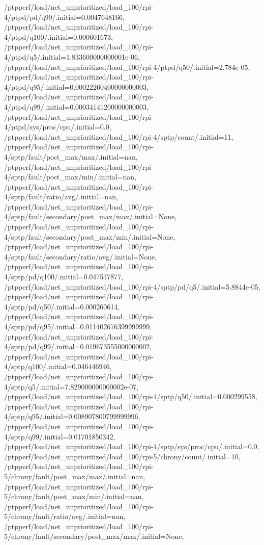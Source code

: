 {    /ptpperf/load/net_unprioritized/load_100/rpi-4/ptpd/pd/q99/.initial=0.0047648166,
    /ptpperf/load/net_unprioritized/load_100/rpi-4/ptpd/q100/.initial=0.000601673,
    /ptpperf/load/net_unprioritized/load_100/rpi-4/ptpd/q5/.initial=1.833600000000001e-06,
    /ptpperf/load/net_unprioritized/load_100/rpi-4/ptpd/q50/.initial=2.784e-05,
    /ptpperf/load/net_unprioritized/load_100/rpi-4/ptpd/q95/.initial=0.00022260400000000003,
    /ptpperf/load/net_unprioritized/load_100/rpi-4/ptpd/q99/.initial=0.00034141200000000003,
    /ptpperf/load/net_unprioritized/load_100/rpi-4/ptpd/sys/proc/cpu/.initial=0.0,
    /ptpperf/load/net_unprioritized/load_100/rpi-4/sptp/count/.initial=11,
    /ptpperf/load/net_unprioritized/load_100/rpi-4/sptp/fault/post_max/max/.initial=nan,
    /ptpperf/load/net_unprioritized/load_100/rpi-4/sptp/fault/post_max/min/.initial=nan,
    /ptpperf/load/net_unprioritized/load_100/rpi-4/sptp/fault/ratio/avg/.initial=nan,
    /ptpperf/load/net_unprioritized/load_100/rpi-4/sptp/fault/secondary/post_max/max/.initial=None,
    /ptpperf/load/net_unprioritized/load_100/rpi-4/sptp/fault/secondary/post_max/min/.initial=None,
    /ptpperf/load/net_unprioritized/load_100/rpi-4/sptp/fault/secondary/ratio/avg/.initial=None,
    /ptpperf/load/net_unprioritized/load_100/rpi-4/sptp/pd/q100/.initial=0.047517877,
    /ptpperf/load/net_unprioritized/load_100/rpi-4/sptp/pd/q5/.initial=5.8844e-05,
    /ptpperf/load/net_unprioritized/load_100/rpi-4/sptp/pd/q50/.initial=0.000260614,
    /ptpperf/load/net_unprioritized/load_100/rpi-4/sptp/pd/q95/.initial=0.011402676399999999,
    /ptpperf/load/net_unprioritized/load_100/rpi-4/sptp/pd/q99/.initial=0.019673555000000002,
    /ptpperf/load/net_unprioritized/load_100/rpi-4/sptp/q100/.initial=0.046446946,
    /ptpperf/load/net_unprioritized/load_100/rpi-4/sptp/q5/.initial=7.829000000000002e-07,
    /ptpperf/load/net_unprioritized/load_100/rpi-4/sptp/q50/.initial=0.000299558,
    /ptpperf/load/net_unprioritized/load_100/rpi-4/sptp/q95/.initial=0.008907800799999996,
    /ptpperf/load/net_unprioritized/load_100/rpi-4/sptp/q99/.initial=0.01701850342,
    /ptpperf/load/net_unprioritized/load_100/rpi-4/sptp/sys/proc/cpu/.initial=0.0,
    /ptpperf/load/net_unprioritized/load_100/rpi-5/chrony/count/.initial=10,
    /ptpperf/load/net_unprioritized/load_100/rpi-5/chrony/fault/post_max/max/.initial=nan,
    /ptpperf/load/net_unprioritized/load_100/rpi-5/chrony/fault/post_max/min/.initial=nan,
    /ptpperf/load/net_unprioritized/load_100/rpi-5/chrony/fault/ratio/avg/.initial=nan,
    /ptpperf/load/net_unprioritized/load_100/rpi-5/chrony/fault/secondary/post_max/max/.initial=None,
}
